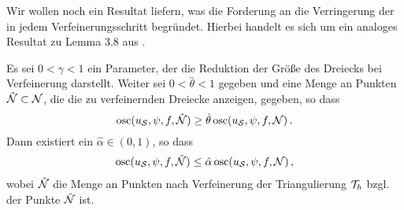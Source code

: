 Wir wollen noch ein Resultat liefern, was die Forderung an die Verringerung der  in jedem Verfeinerungsschritt begründet. Hierbei handelt es sich um ein analoges Resultat zu Lemma 3.8 aus \cite{MorNoc}.

\begin{lemma}\label{lem:4.24}
Es sei $0 < \gamma < 1$ ein Parameter, der die Reduktion der Größe des Dreiecks bei Verfeinerung darstellt. Weiter sei $0 < \hat \theta < 1$ gegeben und eine Menge an Punkten $\hat{\mathcal N}\subset \mathcal N$, die die zu verfeinernden Dreiecke anzeigen, gegeben, so dass
\[
	\operatorname{osc}(u_{\mathcal S},\psi,f,\hat{\mathcal N}) \ge \hat\theta \operatorname{osc} (u_{\mathcal S},\psi,f,\mathcal N) \, .
\]
Dann existiert ein $\hat\alpha \in (0,1)$, so dass
\begin{align}\label{eq:my4.70}
	\operatorname{osc}(u_{\mathcal S},\psi,f,\tilde{\mathcal N}) \le \hat \alpha \operatorname{osc} (u_{\mathcal S},\psi,f,\mathcal N) \, ,
\end{align}
wobei $\tilde{\mathcal N}$ die Menge an Punkten nach Verfeinerung der Triangulierung $\mathcal T_h$ bzgl. der Punkte $\hat{\mathcal N}$ ist.
\end{lemma}

